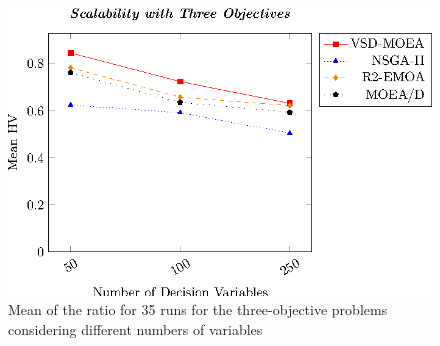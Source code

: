 \begin{figure}[t]
\centering
\includegraphics[scale=0.85]{images/Graphic-Scalability-3obj_tikz-figure0.eps}
\caption{Mean of the \HV{} ratio for 35 runs for the three-objective problems considering different numbers of variables} \label{fig:variable-decision-scalability-3obj}
\end{figure}

